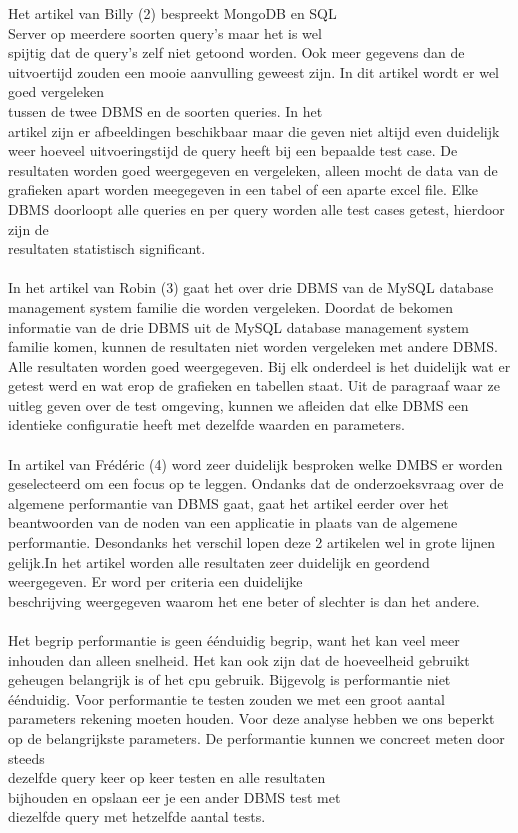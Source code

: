 \documentclass[fleqn,10pt]{artikeltin}
\begin{document}
Het artikel van Billy (2) bespreekt MongoDB en SQL \\Server op meerdere soorten query’s maar het is wel \\spijtig dat de query’s zelf niet getoond worden. Ook meer gegevens dan de uitvoertijd zouden een mooie aanvulling geweest zijn. In dit artikel wordt er wel goed vergeleken \\tussen de twee DBMS en de soorten queries. In het \\artikel zijn er afbeeldingen beschikbaar maar die geven niet altijd even duidelijk weer hoeveel uitvoeringstijd de query heeft bij een bepaalde test case. De resultaten worden goed weergegeven en vergeleken, alleen mocht de data van de \\grafieken apart worden meegegeven in een tabel of een aparte excel file. Elke DBMS doorloopt alle queries en per query worden alle test cases getest, hierdoor zijn de \\resultaten statistisch significant.\\\\
In het artikel van Robin (3) gaat het over drie DBMS van de MySQL database management system familie die worden vergeleken. Doordat de bekomen informatie van de drie DBMS uit de MySQL database management system familie komen, kunnen de resultaten niet worden vergeleken met andere DBMS. Alle resultaten worden goed weergegeven. Bij elk onderdeel is het duidelijk wat er getest werd en wat erop de grafieken en tabellen staat. Uit de paragraaf waar ze uitleg geven over de test omgeving, kunnen we afleiden dat elke DBMS een identieke configuratie heeft met dezelfde waarden en parameters.\\\\
In artikel van Frédéric (4) word zeer duidelijk besproken welke DMBS er worden geselecteerd om een focus op te leggen. Ondanks dat de onderzoeksvraag over de algemene performantie van DBMS gaat, gaat het artikel eerder over het beantwoorden van de noden van een applicatie in plaats van de algemene performantie. Desondanks het verschil lopen deze 2 artikelen wel in grote lijnen gelijk.In het artikel worden alle resultaten zeer duidelijk en geordend \\weergegeven. Er word per criteria een duidelijke \\beschrijving weergegeven waarom het ene beter of slechter is dan het andere.\\\\
Het begrip performantie is geen éénduidig begrip, want het kan veel meer inhouden dan alleen snelheid. Het kan ook zijn dat de hoeveelheid gebruikt geheugen belangrijk is of het cpu gebruik. Bijgevolg is performantie niet éénduidig. Voor performantie te testen zouden we met een groot aantal parameters rekening moeten houden. Voor deze analyse hebben we ons beperkt op de belangrijkste parameters. De performantie kunnen we concreet meten door steeds \\dezelfde query keer op keer testen en alle resultaten \\bijhouden en opslaan eer je een ander DBMS test met \\diezelfde query met hetzelfde aantal tests.\\
\end{document}
